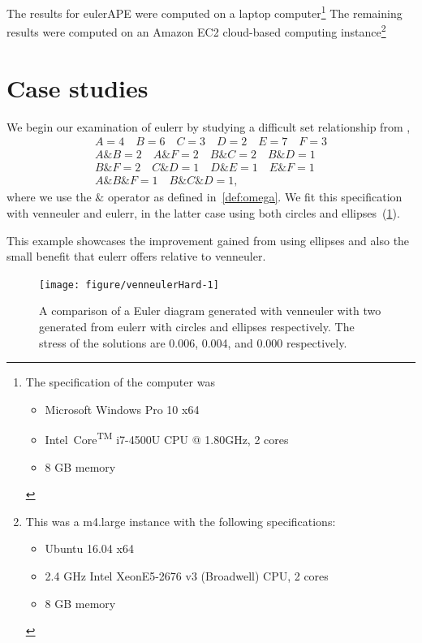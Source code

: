 \documentclass[
  oneside,
  openany,
  numbers=noendperiod,
  parskip=half,
  bibliography=totoc
]{scrbook}\usepackage[]{graphicx}\usepackage{xcolor}
\newenvironment{knitrout}{}{} %
\newcommand{\pkg}[1]{{\fontseries{b}\selectfont #1}}
\begin{document}
The results for \pkg{eulerAPE}
were computed on a laptop computer\footnote{%
  The specification of the computer was
  \begin{itemize}
    \item Microsoft Windows Pro 10 x64
    \item Intel\textregistered~Core\textsuperscript{TM} i7-4500U CPU @
          1.80GHz, 2 cores
    \item 8 GB memory
  \end{itemize}
}
The remaining results were computed on an Amazon EC2
cloud-based computing instance\footnote{
  This was a m4.large instance with the following specifications:
  \begin{itemize}
    \item Ubuntu 16.04 x64
    \item 2.4 GHz Intel Xeon\textregistered E5-2676 v3 (Broadwell) CPU, 2 cores
    \item 8 GB memory
  \end{itemize}
}

\section{Case studies}
\label{sec:caseStudies}

We begin our examination of \pkg{eulerr} by studying a difficult set
relationship from \citet{Wilkinson_2012},
\begin{gather*}
A = 4 \quad B = 6 \quad C = 3 \quad D = 2 \quad E = 7 \quad F = 3\\
A\& B = 2 \quad A\&F = 2 \quad B\& C = 2 \quad B\&D = 1 \\
B\& F = 2 \quad C\&D = 1 \quad D\& E = 1 \quad E\&F = 1 \\
A\&B\&F = 1 \quad B\&C\&D = 1,\end{gather*}
where we use the $\&$ operator as defined in~\cref{def:omega}. We fit this
specification with \pkg{venneuler} and \pkg{eulerr}, in the latter case using
both circles and ellipses~(\cref{fig:venneulerHard}).

This example showcases the improvement gained from using ellipses and also the
small benefit that \pkg{eulerr} offers relative to \pkg{venneuler}.

\begin{figure}[thbp]
\begin{knitrout}\small
{}\color{fgcolor}

{\centering \texttt{[image: figure/venneulerHard-1]}

}



\end{knitrout}
\caption{A comparison of a Euler diagram generated with \pkg{venneuler} with two
generated from \pkg{eulerr} with circles and ellipses respectively. The stress
of the solutions are 0.006, 0.004, and 0.000 respectively.}
\label{fig:venneulerHard}
\end{figure}
\end{document}
